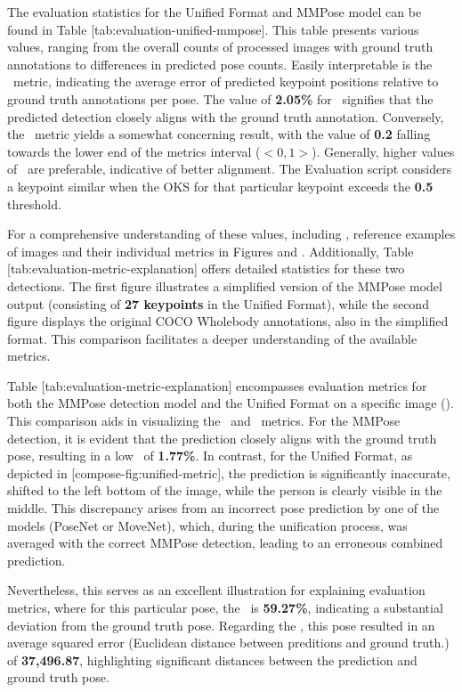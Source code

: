 The evaluation statistics for the Unified Format and MMPose model can be found in Table [tab:evaluation-unified-mmpose]. This table presents various values, ranging from the overall counts of processed images with ground truth annotations to differences in predicted pose counts. Easily interpretable is the \APE\ metric, indicating the average error of predicted keypoint positions relative to ground truth annotations per pose. The value of {\bf 2.05\%} for \APE\ signifies that the predicted detection closely aligns with the ground truth annotation. Conversely, the \OKS\ metric yields a somewhat concerning result, with the value of {\bf 0.2} falling towards the lower end of the metrics interval ($ <0,1> $). Generally, higher values of \OKS\ are preferable, indicative of better alignment. The Evaluation script considers a keypoint similar when the OKS for that particular keypoint exceeds the {\bf 0.5} threshold.

For a comprehensive understanding of these values, including \MSE, reference examples of images and their individual metrics in Figures  and . Additionally, Table [tab:evaluation-metric-explanation] offers detailed statistics for these two detections. The first figure illustrates a simplified version of the MMPose model output (consisting of {\bf 27 keypoints} in the Unified Format), while the second figure displays the original COCO Wholebody annotations, also in the simplified format. This comparison facilitates a deeper understanding of the available metrics.

Table [tab:evaluation-metric-explanation] encompasses evaluation metrics for both the MMPose detection model and the Unified Format on a specific image (). This comparison aids in visualizing the \APE\ and \MSE\ metrics. For the MMPose detection, it is evident that the prediction closely aligns with the ground truth pose, resulting in a low \APE\ of {\bf 1.77\%}. In contrast, for the Unified Format, as depicted in [compose-fig:unified-metric], the prediction is significantly inaccurate, shifted to the left bottom of the image, while the person is clearly visible in the middle. This discrepancy arises from an incorrect pose prediction by one of the models (PoseNet or MoveNet), which, during the unification process, was averaged with the correct MMPose detection, leading to an erroneous combined prediction.

Nevertheless, this serves as an excellent illustration for explaining evaluation metrics, where for this particular pose, the \APE\ is {\bf 59.27\%}, indicating a substantial deviation from the ground truth pose. Regarding the \MSE, this pose resulted in an average squared error (Euclidean distance between preditions and ground truth.) of {\bf 37,496.87}, highlighting significant distances between the prediction and ground truth pose.

